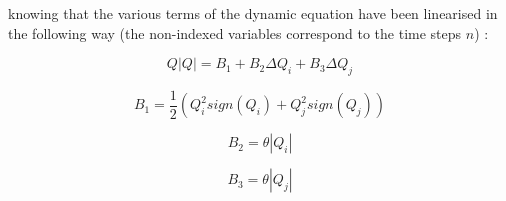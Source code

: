 knowing that the various terms of the dynamic equation have been linearised in the following way (the non-indexed variables correspond to the time steps $n$) :

\begin{equation}
 Q |Q| = B_1 + B_2 \Delta Q_i + B_3 \Delta Q_j
\end{equation}

\begin{equation}
 B_1 = \frac{1}{2} ( Q_{i}^2 sign(Q_i) + Q_{j}^2 sign(Q_j) )
\end{equation}

\begin{equation}
 B_2 = \theta |Q_i|
\end{equation}

\begin{equation}
 B_3 = \theta |Q_j|
\end{equation}

